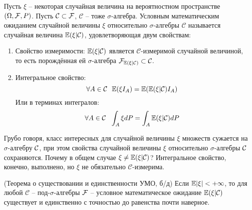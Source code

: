\begin{definition}
    Пусть $\xi$ -- некоторая случайная величина на вероятностном пространстве $(\Omega, \mathcal{F}, P)$. Пусть $\mathcal{C} \subset \mathcal{F}$, $\mathcal{C}$ -- тоже $\sigma$-алгебра. Условным математическим ожиданием случайной величины $\xi$ относительно $\sigma$-алгебры $\mathcal{C}$ называется случайная величина $\mathbb{E}(\xi | \mathcal{C})$, удовлетворяющая двум свойствам:
    \begin{enumerate}
        \item Свойство измеримости: $\mathbb{E}(\xi | \mathcal{C})$ является $\mathcal{C}$-измеримой случайной величиной, то есть порождённая ей $\sigma$-алгебра $\mathcal{F}_{\mathbb{E}(\xi | \mathcal{C})} \subset \mathcal{C}$.

        \item Интегральное свойство:
        \[
            \forall A \in \mathcal{C} \ \ \mathbb{E}(\xi I_A) = \mathbb{E}(\mathbb{E}(\xi | \mathcal{C}) I_A)
        \]
        Или в терминах интегралов:
        \[
            \forall A \in \mathcal{C} \ \ \int_A \xi dP = \int_A \mathbb{E}(\xi | \mathcal{C}) dP
        \]
    \end{enumerate}
\end{definition}

\begin{note}
    Грубо говоря, класс интересных для случайной величины $\xi$ множеств сужается на $\sigma$-алгебру $\mathcal{C}$, при этом свойства случайной величины $\xi$ относительно $\sigma$-алгебры $\mathcal{C}$ сохраняются. Почему в общем случае $\xi \neq \mathbb{E}(\xi | \mathcal{C})$? Интегральное свойство, конечно, выполнено, но $\xi$ не обязательно $\mathcal{C}$-измерима.
\end{note}

\begin{theorem} (Теорема о существовании и единственности УМО, б/д)
    Если $\mathbb{E}|\xi| < +\infty$, то для любой $\mathcal{C}$ -- под-$\sigma$-алгебры $\mathcal{F}$ -- условное математическое ожидание $\mathbb{E}(\xi | \mathcal{C})$ существует и единственно с точностью до равенства почти наверное.
\end{theorem}

